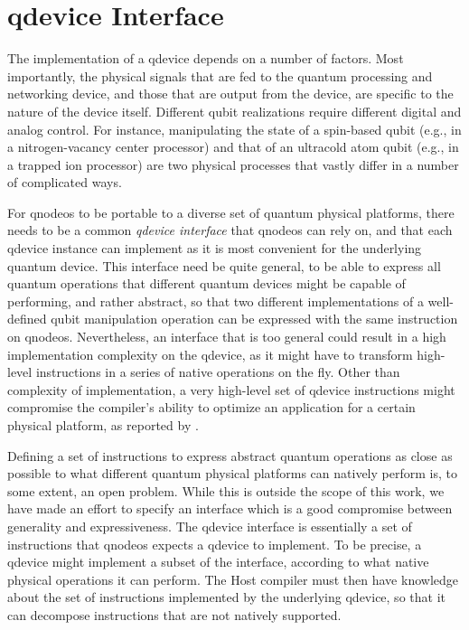 \chapter{\acrshort{qdevice} Interface} \label{app:qdevice}

The implementation of a \acrshort{qdevice} depends on a number of factors. Most importantly, the
physical signals that are fed to the quantum processing and networking device, and those that are
output from the device, are specific to the nature of the device itself. Different qubit
realizations require different digital and analog control. For instance, manipulating the state of a
spin-based qubit (e.g., in a nitrogen-vacancy center processor) and that of an ultracold atom qubit
(e.g., in a trapped ion processor) are two physical processes that vastly differ in a number of
complicated ways.

For \acrshort{qnodeos} to be portable to a diverse set of quantum physical platforms, there needs to
be a common \emph{\acrshort{qdevice} interface} that \acrshort{qnodeos} can rely on, and that each
\acrshort{qdevice} instance can implement as it is most convenient for the underlying quantum
device. This interface need be quite general, to be able to express all quantum operations that
different quantum devices might be capable of performing, and rather abstract, so that two different
implementations of a well-defined qubit manipulation operation can be expressed with the same
instruction on \acrshort{qnodeos}. Nevertheless, an interface that is too general could result in a
high implementation complexity on the \acrshort{qdevice}, as it might have to transform high-level
instructions in a series of native operations on the fly. Other than complexity of implementation, a
very high-level set of \acrshort{qdevice} instructions might compromise the compiler's ability to
optimize an application for a certain physical platform, as reported by
\textcite{murali_2019_fullstack}.

Defining a set of instructions to express abstract quantum operations as close as possible to what
different quantum physical platforms can natively perform is, to some extent, an open problem. While
this is outside the scope of this work, we have made an effort to specify an interface which is a
good compromise between generality and expressiveness. The \acrshort{qdevice} interface is
essentially a set of instructions that \acrshort{qnodeos} expects a \acrshort{qdevice} to implement.
To be precise, a \acrshort{qdevice} might implement a subset of the interface, according to what
native physical operations it can perform. The Host compiler must then have knowledge about the set
of instructions implemented by the underlying \acrshort{qdevice}, so that it can decompose
instructions that are not natively supported.


